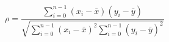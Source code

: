 \documentclass[12pt]{article}
\begin{document}
$  \begin{equation*}    \rho = \dfrac{\displaystyle\sum_{i=0}^{n-1}(x_i-\bar{x})(y_i-\bar{y})}{\sqrt{\displaystyle\sum_{i=0}^{n-1}(x_i-\bar{x})^2 \displaystyle\sum_{i=0}^{n-1}(y_i-\bar{y})^2}}    \end{equation*}     $
\end{document}
